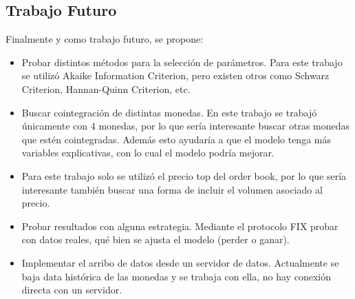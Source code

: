 \subsection{Trabajo Futuro}
Finalmente y como trabajo futuro, se propone:
\begin{itemize}
 \item Probar distintos métodos para la selección de parámetros. Para este
trabajo se utilizó Akaike Information Criterion, pero existen otros como
Schwarz Criterion, Hannan-Quinn Criterion, etc.
 \item Buscar cointegración de distintas monedas. En este trabajo se trabajó
únicamente con 4 monedas, por lo que sería interesante buscar otras monedas que
estén cointegradas. Además esto ayudaría a que el modelo tenga más variables
explicativas, con lo cual el modelo podría mejorar.
 \item Para este trabajo solo se utilizó el precio top del order book,
por lo que sería interesante también buscar una forma de incluir el volumen
asociado al precio.
 \item Probar resultados con alguna estrategia. Mediante el protocolo FIX
probar con datos reales, qué bien se ajusta el modelo (perder o ganar).
 \item Implementar el arribo de datos desde un servidor de datos. Actualmente
se baja data histórica de las monedas y se trabaja con ella, no hay conexión
directa con un servidor.
\end{itemize}

